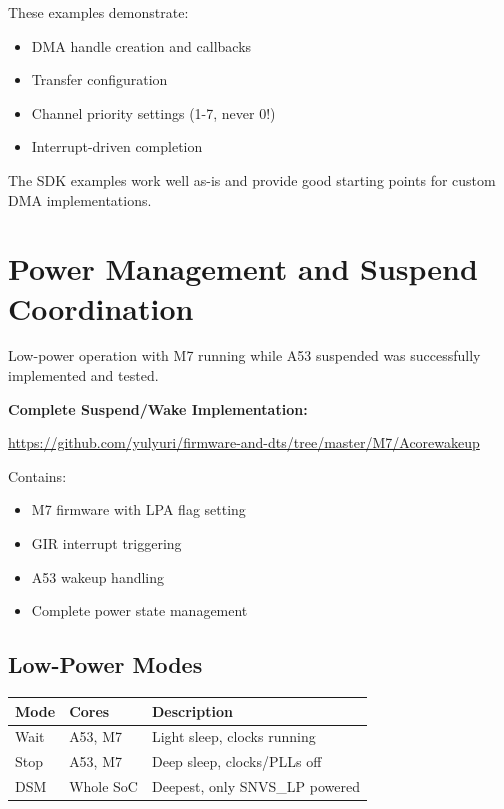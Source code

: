 \documentclass[12pt,a4paper]{report}
\begin{document}
These examples demonstrate:
\begin{itemize}
    \item DMA handle creation and callbacks
    \item Transfer configuration
    \item Channel priority settings (1-7, never 0!)
    \item Interrupt-driven completion
\end{itemize}

The SDK examples work well as-is and provide good starting points for custom DMA implementations.

\section{Power Management and Suspend Coordination}

Low-power operation with M7 running while A53 suspended was successfully implemented and tested.

\begin{gitref}
\textbf{Complete Suspend/Wake Implementation:}

\url{https://github.com/yulyuri/firmware-and-dts/tree/master/M7/Acorewakeup}

Contains:
\begin{itemize}
    \item M7 firmware with LPA flag setting
    \item GIR interrupt triggering
    \item A53 wakeup handling
    \item Complete power state management
\end{itemize}
\end{gitref}


\subsection{Low-Power Modes}

\begin{center}
\begin{tabular}{|l|l|p{6cm}|}
\hline
\textbf{Mode} & \textbf{Cores} & \textbf{Description} \\
\hline
Wait & A53, M7 & Light sleep, clocks running \\
\hline
Stop & A53, M7 & Deep sleep, clocks/PLLs off \\
\hline
DSM & Whole SoC & Deepest, only SNVS\_LP powered \\
\hline
\end{tabular}
\end{center}
\end{document}
